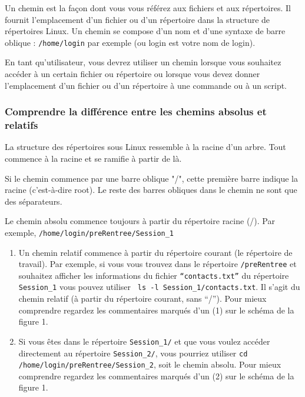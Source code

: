 \documentclass{article}
\begin{document}
\begin{exercice}

Un chemin est la façon dont vous vous référez aux fichiers et aux répertoires. Il fournit l'emplacement d'un fichier ou d'un répertoire dans la structure de répertoires Linux. 
Un chemin se compose d'un nom et d'une syntaxe de barre oblique : \texttt{/home/login} par exemple (ou login est votre nom de login).

En tant qu'utilisateur, vous devrez utiliser un chemin lorsque vous souhaitez accéder à un certain fichier ou répertoire ou lorsque vous devez donner l'emplacement
d'un fichier ou d'un répertoire à une commande ou à un script.

\subsubsection*{Comprendre la différence entre les chemins absolus et relatifs}\label{Comprendre la différence entre les chemins absolus et relatifs}

La structure des répertoires sous Linux ressemble à la racine d'un arbre. Tout commence à la racine et se ramifie à partir de là.

Si le chemin commence par une barre oblique "/", cette première barre indique la racine (c'est-à-dire root). Le reste des barres obliques dans le chemin ne sont que des séparateurs. 

Le chemin absolu commence toujours à partir du répertoire racine (/). Par exemple, \texttt{/home/login/preRentree/Session\_1}

\begin{enumerate}

\item 
Un chemin relatif commence à partir du répertoire courant (le répertoire de travail). Par exemple, si vous vous trouvez dans le répertoire \texttt{/preRentree} et souhaitez afficher les informations du fichier \texttt{``contacts.txt''} du répertoire \texttt{Session\_1} vous pouvez utiliser \texttt{ ls -l Session\_1/contacts.txt}. Il s'agit du chemin relatif (à partir du répertoire courant, sans ``/''). Pour mieux comprendre regardez les commentaires marqués d'un (1) sur le schéma de la figure 1.

\medskip

\item
Si vous êtes dans le répertoire \texttt{Session\_1/} et que vous voulez accéder directement au répertoire \texttt{Session\_2/}, vous pourriez utiliser \texttt{cd /home/login/preRentree/Session\_2}, soit le chemin absolu. Pour mieux comprendre regardez les commentaires marqués d'un (2) sur le schéma de la figure 1.


\end{enumerate}
\end{exercice}
\end{document}
